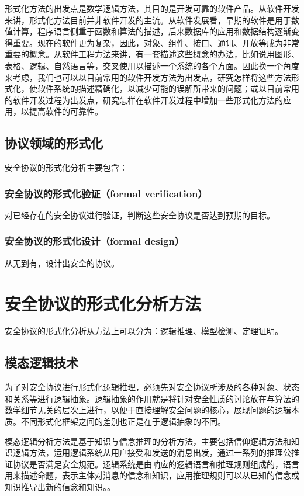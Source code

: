 \documentclass[cs4size,a4pape,UTF8]{ctexart}
\numberwithin{equation}{section}
\numberwithin{table}{section}
\numberwithin{figure}{section}
\begin{document}
形式化方法的出发点是数学逻辑方法，其目的是开发可靠的软件产品。从软件开发来讲，形式化方法目前并非软件开发的主流。从软件发展看，早期的软件是用于数值计算，程序语言侧重于函数和算法的描述，后来数据库的应用和数据结构逐渐变得重要。现在的软件更为复杂，因此，对象、组件、接口、通讯、开放等成为非常重要的概念。从软件工程方法来讲，有一套描述这些概念的办法，比如说用图形、表格、逻辑、自然语言等，交叉使用以描述一个系统的各个方面。因此换一个角度来考虑，我们也可以以目前常用的软件开发方法为出发点，研究怎样将这些方法形式化，使软件系统的描述精确化，以减少可能的误解所带来的问题；或以目前常用的软件开发过程为出发点，研究怎样在软件开发过程中增加一些形式化方法的应用，以提高软件的可靠性\cite{1}。

\subsection{协议领域的形式化}
安全协议的形式化分析主要包含：


\subsubsection{安全协议的形式化验证（formal verification）}
对已经存在的安全协议进行验证，判断这些安全协议是否达到预期的目标。

\subsubsection{安全协议的形式化设计（formal design）}
从无到有，设计出安全的协议。


\newpage
\section{安全协议的形式化分析方法}
安全协议的形式化分析从方法上可以分为：逻辑推理、模型检测、定理证明。

\subsection{模态逻辑技术}
为了对安全协议进行形式化逻辑推理，必须先对安全协议所涉及的各种对象、状态和关系等进行逻辑抽象。逻辑抽象的作用就是将针对安全性质的讨论放在与算法的数学细节无关的层次上进行，以便于直接理解安全问题的核心，展现问题的逻辑本质。不同形式化框架之间的差别也正是在于逻辑抽象的不同\cite{book}。

模态逻辑分析方法是基于知识与信念推理的分析方法，主要包括信仰逻辑方法和知识逻辑方法，运用逻辑系统从用户接受和发送的消息出发，通过一系列的推理公推证协议是否满足安全规范。逻辑系统是由响应的逻辑语言和推理规则组成的，语言用来描述命题，表示主体对消息的信念和知识，应用推理规则可以从已知的信念或知识推导出新的信念和知识。\cite{book}\cite{2}。
\end{document}
